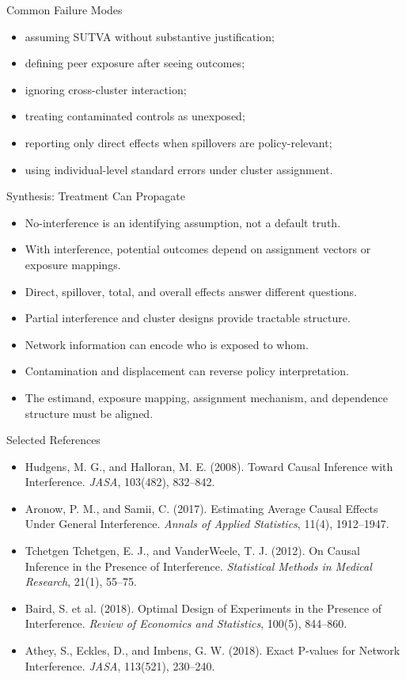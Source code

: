 \documentclass[aspectratio=169,11pt]{beamer}
\begin{document}
\begin{frame}{Common Failure Modes}
\begin{itemize}
\item assuming SUTVA without substantive justification;
\item defining peer exposure after seeing outcomes;
\item ignoring cross-cluster interaction;
\item treating contaminated controls as unexposed;
\item reporting only direct effects when spillovers are policy-relevant;
\item using individual-level standard errors under cluster assignment.
\end{itemize}
\end{frame}

\begin{frame}{Synthesis: Treatment Can Propagate}
\begin{itemize}
\item No-interference is an identifying assumption, not a default truth.
\item With interference, potential outcomes depend on assignment vectors or exposure mappings.
\item Direct, spillover, total, and overall effects answer different questions.
\item Partial interference and cluster designs provide tractable structure.
\item Network information can encode who is exposed to whom.
\item Contamination and displacement can reverse policy interpretation.
\item The estimand, exposure mapping, assignment mechanism, and dependence structure must be aligned.
\end{itemize}
\end{frame}

\begin{frame}{Selected References}
\small
\begin{itemize}
\item Hudgens, M. G., and Halloran, M. E. (2008). Toward Causal Inference with Interference. \textit{JASA}, 103(482), 832--842.
\item Aronow, P. M., and Samii, C. (2017). Estimating Average Causal Effects Under General Interference. \textit{Annals of Applied Statistics}, 11(4), 1912--1947.
\item Tchetgen Tchetgen, E. J., and VanderWeele, T. J. (2012). On Causal Inference in the Presence of Interference. \textit{Statistical Methods in Medical Research}, 21(1), 55--75.
\item Baird, S. et al. (2018). Optimal Design of Experiments in the Presence of Interference. \textit{Review of Economics and Statistics}, 100(5), 844--860.
\item Athey, S., Eckles, D., and Imbens, G. W. (2018). Exact P-values for Network Interference. \textit{JASA}, 113(521), 230--240.
\end{itemize}
\end{frame}

\contactslide
\end{document}
